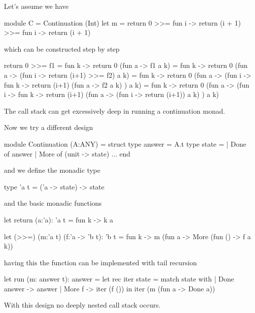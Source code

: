Let's assume we have
\begin{ocaml}
   module C = Continuation (Int)
   let m = return 0 >>= fun i -> return (i + 1) >>= fun i -> return (i + 1)
\end{ocaml}
%
which can be constructed step by step
\begin{ocaml}
  return 0 >>= f1
  =
  fun k -> return 0 (fun a -> f1 a k)
  =
  fun k -> return 0 (fun a -> (fun i -> return (i+1) >>= f2) a k)
  =
  fun k -> return
             0
             (fun a -> (fun i ->
                          fun k ->
                            return
                              (i+1)
                              (fun a -> f2 a k)
                       ) a k)
  =
  fun k -> return
             0
             (fun a -> (fun i ->
                          fun k ->
                            return
                              (i+1)
                              (fun a -> (fun i -> return (i+1)) a k)
                       ) a k)
\end{ocaml}
%
The call stack can get excessively deep in running a continuation monad.

Now we try a different design
%
\begin{ocaml}
    module Continuation (A:ANY) =
    struct
        type answer = A.t
        type state =
          | Done of answer
          | More of (unit -> state)
        ...
    end
\end{ocaml}
%
and we define the monadic type
\begin{ocaml}
    type 'a t = ('a -> state) -> state
\end{ocaml}
%
and the basic monadic functions
\begin{ocaml}
     let return (a:'a): 'a t =
         fun k -> k a

     let (>>=) (m:'a t) (f:'a -> 'b t): 'b t =
         fun k ->
         m (fun a -> More (fun () -> f a k))
\end{ocaml}
%
having this the function  can be implemented with tail recursion
\begin{ocaml}
    let run (m: answer t): answer =
        let rec iter state =
            match state with
            | Done answer ->
                answer
            | More f ->
                iter (f ())
        in
        iter (m (fun a -> Done a))
\end{ocaml}
%
With this design no deeply nested call stack occurs.






